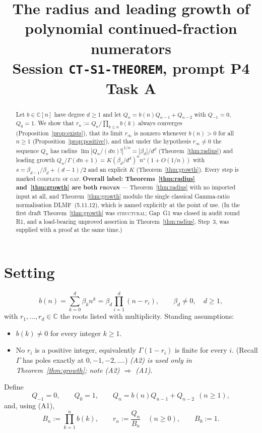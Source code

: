 \documentclass[11pt]{article}
\title{The radius and leading growth of polynomial continued-fraction
numerators\\[4pt]
\large Session \texttt{CT-S1-THEOREM}, prompt P4 Task A}
\author{}
\date{}
\theoremstyle{definition}
\newcommand{\bd}{\beta_d}
\newcommand{\bdm}{\beta_{d-1}}
\newcommand{\rinf}{r_\infty}
\newcommand{\C}{\mathbb{C}}
\begin{document}
\maketitle

\begin{abstract}
Let $b\in\C[n]$ have degree $d\ge 1$ and let $Q_n=b(n)Q_{n-1}+Q_{n-2}$ with
$Q_{-1}=0$, $Q_0=1$. We show that $r_n:=Q_n/\prod_{k\le n}b(k)$ always
converges (Proposition~\ref{prop:exists}), that its limit $\rinf$ is nonzero
whenever $b(n)>0$ for all $n\ge1$ (Proposition~\ref{prop:positive}), and that
under the hypothesis $\rinf\neq0$ the sequence $Q_n$ has radius
$\lim|Q_n/(dn)!|^{1/n}=|\bd|/d^d$ (Theorem~\ref{thm:radius}) and leading growth
$Q_n/\Gamma(dn+1)=K(\bd/d^d)^n n^s(1+O(1/n))$ with
$s=\bdm/\bd+(d-1)/2$ and an explicit $K$ (Theorem~\ref{thm:growth}).
Every step is marked \textsc{complete} or \textsc{gap}.
\textbf{Overall label: Theorems~\ref{thm:radius} and~\ref{thm:growth} are both
\textsc{proven}} --- Theorem~\ref{thm:radius} with no imported input at all, and
Theorem~\ref{thm:growth} modulo the single classical Gamma-ratio normalisation
DLMF~(5.11.12), which is named explicitly at the point of
use. (In the first draft Theorem~\ref{thm:growth} was \textsc{structural}; Gap~G1
was closed in audit round R1, and a load-bearing unproved assertion in
Theorem~\ref{thm:radius}, Step~3, was supplied with a proof at the same time.)
\end{abstract}

\section{Setting}

\begin{equation}\label{eq:setting}
b(n)=\sum_{k=0}^{d}\beta_k n^k=\bd\prod_{i=1}^{d}(n-r_i),
\qquad \bd\neq0,\quad d\ge1,
\end{equation}
with $r_1,\dots,r_d\in\C$ the roots listed with multiplicity. Standing
assumptions:
\begin{itemize}
\item[\textbf{(A1)}] $b(k)\neq0$ for every integer $k\ge1$.
\item[\textbf{(A2)}] No $r_i$ is a positive integer, equivalently
$\Gamma(1-r_i)$ is finite for every $i$. (Recall $\Gamma$ has poles exactly at
$0,-1,-2,\dots$.) \emph{(A2) is used only in Theorem~\ref{thm:growth}; note
(A2) $\Rightarrow$ (A1).}
\end{itemize}
Define
\begin{equation}\label{eq:rec}
Q_{-1}=0,\qquad Q_0=1,\qquad Q_n=b(n)Q_{n-1}+Q_{n-2}\ \ (n\ge1),
\end{equation}
and, using (A1),
\begin{equation}\label{eq:rn}
B_n:=\prod_{k=1}^{n}b(k),\qquad r_n:=\frac{Q_n}{B_n}\quad(n\ge0),\qquad B_0:=1 .
\end{equation}
\end{document}
